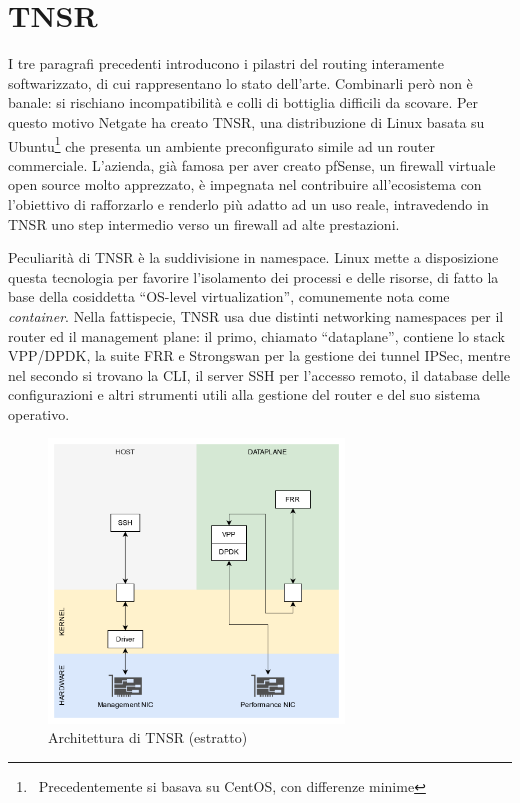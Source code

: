 \section{TNSR}

I tre paragrafi precedenti introducono i pilastri del routing interamente softwarizzato, di cui rappresentano lo stato dell'arte. Combinarli però non è banale: si rischiano incompatibilità e colli di bottiglia difficili da scovare. Per questo motivo Netgate ha creato TNSR, una distribuzione di Linux basata su Ubuntu\footnote{\ Precedentemente si basava su CentOS, con differenze minime} che presenta un ambiente preconfigurato simile ad un router commerciale. L'azienda, già famosa per aver creato pfSense, un firewall virtuale open source molto apprezzato, è impegnata nel contribuire all'ecosistema con l'obiettivo di rafforzarlo e renderlo più adatto ad un uso reale, intravedendo in TNSR uno step intermedio verso un firewall ad alte prestazioni.

Peculiarità di TNSR è la suddivisione in namespace. Linux mette a disposizione questa tecnologia per favorire l'isolamento dei processi e delle risorse, di fatto la base della cosiddetta ``OS-level virtualization'', comunemente nota come \textit{container}. Nella fattispecie, TNSR usa due distinti networking namespaces per il router ed il management plane: il primo, chiamato ``dataplane'', contiene lo stack VPP/DPDK, la suite FRR e Strongswan per la gestione dei tunnel IPSec, mentre nel secondo si trovano la CLI, il server SSH per l'accesso remoto, il database delle configurazioni e altri strumenti utili alla gestione del router e del suo sistema operativo.

\begin{figure}[htb]
    \includegraphics[width=0.7\textwidth]{graphics/tnsr-arch.png}
    \caption{Architettura di TNSR (estratto)}
    \label{fig:tnsr-arch}
\end{figure}

